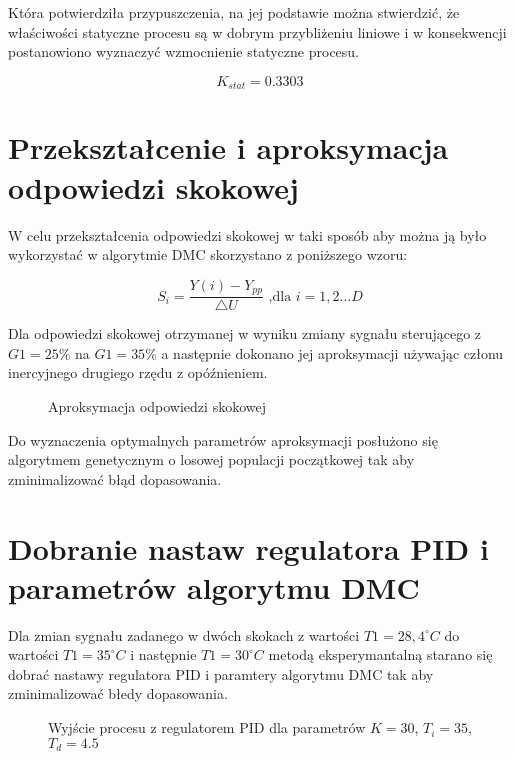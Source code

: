 Która potwierdziła przypuszczenia, na jej podstawie można stwierdzić, że właściwości statyczne procesu są w dobrym przybliżeniu liniowe i w konsekwencji postanowiono wyznaczyć wzmocnienie statyczne procesu.

\begin{equation}
K_{stat} = 0.3303
\end{equation}

\section{Przekształcenie i aproksymacja odpowiedzi skokowej}

W celu przekształcenia odpowiedzi skokowej w taki sposób aby można ją było wykorzystać w algorytmie DMC skorzystano z poniższego wzoru: 

\begin{equation}
S_i=\frac{Y(i)-Y_{pp}}{\triangle U} \textrm{ ,dla } i=1,2 \ldots D
\label{step_norm}
\end{equation}

Dla odpowiedzi skokowej otrzymanej w wyniku zmiany sygnału sterującego z $G1 = 25\%$ na $G1 = 35\%$ a następnie dokonano jej aproksymacji używając członu inercyjnego drugiego rzędu z opóźnieniem.

\begin{figure}[H]
\centering

\caption{Aproksymacja odpowiedzi skokowej}
\end{figure}

Do wyznaczenia optymalnych parametrów aproksymacji posłużono się algorytmem genetycznym o losowej populacji początkowej tak aby zminimalizować błąd dopasowania.

\section{Dobranie nastaw regulatora PID i parametrów algorytmu DMC}
 
Dla zmian sygnału zadanego w dwóch skokach z wartości  $T1 = 28,4^{\circ} C$ do wartości  $T1 = 35^{\circ} C$ i następnie  $T1 = 30^{\circ} C$ metodą eksperymantalną starano się dobrać nastawy regulatora PID i paramtery algorytmu DMC tak aby zminimalizować błedy dopasowania.

\begin{figure}[H]
\centering

\caption{Wyjście procesu z regulatorem PID dla parametrów $K = 30$, $ T_i = 35$,  $T_d = 4.5$}
\end{figure}


